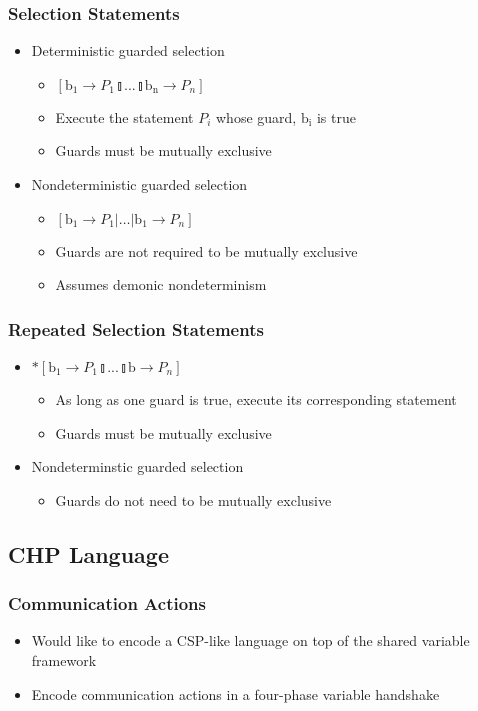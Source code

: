 \documentclass[compress]{beamer}
\begin{document}
\begin{frame}
\frametitle{Selection Statements}
\begin{itemize}
\item Deterministic guarded selection
\begin{itemize}
\item $[\mathrm{b_1} \rightarrow P_1 \talloblong ... \talloblong \mathrm{b_n} \rightarrow P_n]$
\item Execute the statement $P_i$ whose guard, $\mathrm{b_i}$ is true
\item Guards must be mutually exclusive
\end{itemize}
\pause
\item Nondeterministic guarded selection
\begin{itemize}
\item $ [\textrm{b}_1 \rightarrow P_1 | \ldots | \textrm{b}_1 \rightarrow P_n ] $
\item Guards are not required to be mutually exclusive
\item Assumes demonic nondeterminism
\end{itemize}
\end{itemize}
\end{frame}
\begin{frame}
\frametitle{Repeated Selection Statements}
\begin{itemize}
\item  $*[\textrm{b}_1 \rightarrow P_1 \talloblong ... \talloblong \textrm{b} \rightarrow P_n]$
\begin{itemize}
\item As long as one guard is true, execute its corresponding statement
\item Guards must be mutually exclusive
\end{itemize}
\pause
\item Nondeterminstic guarded selection
\begin{itemize}
\item Guards do not need to be mutually exclusive
\end{itemize}
\end{itemize}
\end{frame}
\subsection{CHP Language}
\begin{frame}
\frametitle{Communication Actions}
\begin{itemize}
\item Would like to encode a CSP-like language on top of the shared variable framework
\pause
\item Encode communication actions in a four-phase variable handshake
\end{itemize}
\end{frame}
\end{document}
